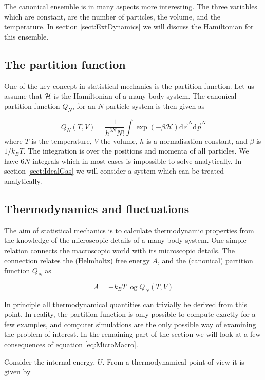 The canonical ensemble is in many aspects more interesting. The three
variables which are constant, are the number of particles, the volume,
and the temperature. In section \ref{sect:ExtDynamics} we will discuss
the Hamiltonian for this ensemble.


\subsection{The partition function}
\label{sect:PartFunc}
One of the key concept in statistical mechanics is the partition function.
Let us assume that $\cal{H}$ is the Hamiltonian of a many-body system.
The canonical partition function $Q_N$, for an $N$-particle system is
then given as 

\begin{equation}
  Q_N(T, V) = \frac{1}{h^{3N} N!} \int \exp(-\beta\mathcal{H})
  \mathrm{d}\vec{r}^N\mathrm{d}\vec{p}^N
\end{equation}
where $T$ is the temperature, $V$ the volume, $h$ is a normalisation
constant, and $\beta$ is $1/k_B T$. The
integration is over the positions and momenta of all particles. We have
$6N$ integrals which in most cases is impossible to solve
analytically. In section \ref{sect:IdealGas} we will consider a system
which can be treated analytically.


\subsection{Thermodynamics and fluctuations}
\label{sect:Thermo}
The aim of statistical mechanics is to calculate thermodynamic
properties from the knowledge of the microscopic details of a
many-body system. One simple relation connects the macroscopic world
with its microscopic details. The connection relates the (Helmholtz)
free energy $A$, and the (canonical) partition function $Q_N$ as

\begin{equation}
  \label{eq:MicroMacro}
   A = -k_B T \log Q_N(T, V)
\end{equation}

In principle all thermodynamical quantities can trivially be derived
from this point. In reality, the partition function is only possible
to compute exactly for a few examples, and computer simulations are the
only possible way of examining the problem of interest. In the
remaining part of the section we will look at a few consequences of
equation \eqref{eq:MicroMacro}.

Consider the internal energy, $U$. From a thermodynamical point of view
it is given by \cite{Atkins94}

